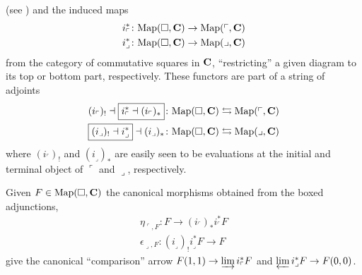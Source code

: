 (see \cite[Notation \textbf{1.2.8.4}]{HTT}) and the induced maps
\begin{gather}
i_\ulcorner^*\colon \text{Map}(\square, \mathbf{C}) \to \text{Map}(\ulcorner,\mathbf{C})\\
i_\lrcorner^*\colon \text{Map}(\square, \mathbf{C}) \to \text{Map}(\lrcorner,\mathbf{C})
\end{gather}
from the category of commutative squares in $\mathbf{C}$, ``restricting'' a given diagram to its top or bottom part, respectively. These functors are part of a string of adjoints
\begin{gather}
(i_\ulcorner)_! \dashv \boxed{i_\ulcorner^* \dashv (i_\ulcorner)_*}\colon \text{Map}(\square,\mathbf{C})\leftrightarrows \text{Map}(\ulcorner,\mathbf{C})\\
\boxed{(i_\lrcorner)_! \dashv i_\lrcorner^*} \dashv (i_\lrcorner)_*\colon \text{Map}(\square,\mathbf{C})\leftrightarrows \text{Map}(\lrcorner,\mathbf{C})
\end{gather}
where $(i_\ulcorner)_!$ and $(i_\lrcorner)_*$ are easily seen to be evaluations at the initial and terminal object of $\ulcorner$ and $\lrcorner$, respectively.

Given $F\in \text{Map}(\square, \mathbf{C})$ the canonical morphisms obtained from the boxed adjunctions,
\begin{gather*}
\eta_{\ulcorner, F}\colon F\to (i_\ulcorner)_*i_\ulcorner^* F\\
\epsilon_{\lrcorner, F}\colon (i_\lrcorner)_!  i_\lrcorner^*F\to F
\end{gather*}
give the canonical ``comparison'' arrow $F(1,1) \to \varinjlim i_\ulcorner^* F$ and $\varprojlim i_\lrcorner^*F\to F(0,0)$.

